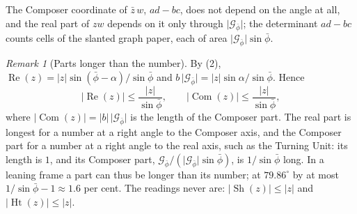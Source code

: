 \documentclass[11pt,a4paper]{amsart}
\theoremstyle{plain}
\theoremstyle{definition}
\theoremstyle{remark}
\newtheorem{remark}[theorem]{Remark}
\newcommand{\pb}{\bar{\phi}}                     %
\newcommand{\Gp}{\mathcal{G}_{\bar{\phi}}}       %
\renewcommand{\Re}{\operatorname{Re}}            %
\DeclareMathOperator{\Com}{Com}                  %
\DeclareMathOperator{\Sh}{Sh}                    %
\DeclareMathOperator{\Ht}{Ht}                    %
\begin{document}
The Composer coordinate of $\bar{z}\,w$, $ad - bc$, does not depend on the angle at all, and the real part of $zw$ depends on it only through $\lvert\Gp\rvert$; the determinant $ad - bc$ counts cells of the slanted graph paper, each of area $\lvert\Gp\rvert\sin\pb$.

\begin{remark}[Parts longer than the number]\label{rem:longer}
By (2), $\Re(z) = \lvert z\rvert\sin(\pb - \alpha)/\sin\pb$ and $b\,\lvert\Gp\rvert = \lvert z\rvert\sin\alpha/\sin\pb$. Hence
\[
\lvert\Re(z)\rvert \le \frac{\lvert z\rvert}{\sin\pb} , \qquad \lvert\Com(z)\rvert \le \frac{\lvert z\rvert}{\sin\pb} ,
\]
where $\lvert\Com(z)\rvert = \lvert b\rvert\,\lvert\Gp\rvert$ is the length of the Composer part. The real part is longest for a number at a right angle to the Composer axis, and the Composer part for a number at a right angle to the real axis, such as the Turning Unit: its length is $1$, and its Composer part, $\Gp/(\lvert\Gp\rvert\sin\pb)$, is $1/\sin\pb$ long. In a leaning frame a part can thus be longer than its number; at $79.86^\circ$ by at most $1/\sin\pb - 1 \approx 1.6$ per cent. The readings never are: $\lvert\Sh(z)\rvert \le \lvert z\rvert$ and $\lvert\Ht(z)\rvert \le \lvert z\rvert$.
\end{remark}
\end{document}
